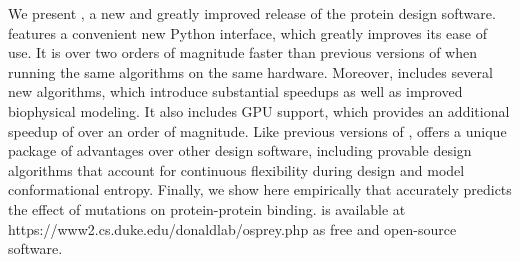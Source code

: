 We present , a new and greatly improved release of the \osprey protein design software.   features a convenient new Python interface, which greatly improves its ease of use.  It is over two orders of magnitude faster than previous versions of \osprey when running the same algorithms on the same hardware.  Moreover,  includes several new algorithms, which introduce substantial speedups as well as improved biophysical modeling.  It also includes GPU support, which provides an additional speedup of over an order of magnitude.  Like previous versions of \osprey,  offers a unique package of advantages over other design software, including provable design algorithms that account for continuous flexibility during design and model conformational entropy.  Finally, we show here empirically that  accurately predicts the effect of mutations on protein-protein binding.  is available at https://www2.cs.duke.edu/donaldlab/osprey.php as free and open-source software.    
